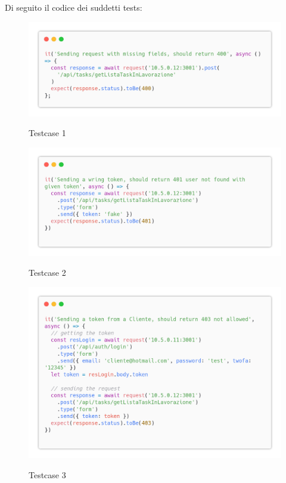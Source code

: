 \documentclass{report}
\begin{document}
Di seguito il codice dei suddetti tests:

\begin{figure}[H]
	\centering\includegraphics[width=1\textwidth]{images/code_in_lavorazione_test1.png}

	Testcase 1
\end{figure}
\begin{figure}[H]
	\centering\includegraphics[width=1\textwidth]{images/code_in_lavorazione_test2.png}

	Testcase 2
\end{figure}
\begin{figure}[H]
	\centering\includegraphics[width=1\textwidth]{images/code_in_lavorazione_test3.png}

	Testcase 3
\end{figure}
\end{document}
